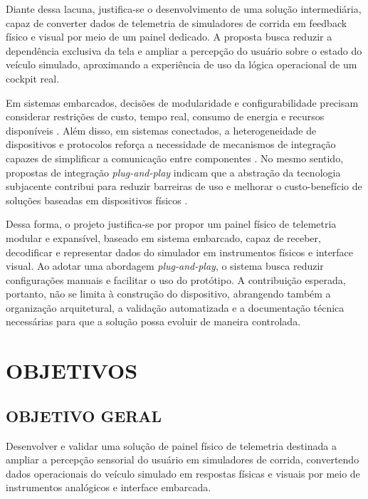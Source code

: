 \documentclass[
  12pt,
  oneside,
  a4paper,
  chapter=TITLE,
  section=TITLE,
  subsection=TITLE,
  brazil
]{abntex2}
\begin{document}
Diante dessa lacuna, justifica-se o desenvolvimento de uma solução intermediária, capaz de converter dados de telemetria de simuladores de corrida em feedback físico e visual por meio de um painel dedicado. A proposta busca reduzir a dependência exclusiva da tela e ampliar a percepção do usuário sobre o estado do veículo simulado, aproximando a experiência de uso da lógica operacional de um cockpit real.

Em sistemas embarcados, decisões de modularidade e configurabilidade precisam considerar restrições de custo, tempo real, consumo de energia e recursos disponíveis \cite{friedrich2001}. Além disso, em sistemas conectados, a heterogeneidade de dispositivos e protocolos reforça a necessidade de mecanismos de integração capazes de simplificar a comunicação entre componentes \cite{alfuqaha2015}. No mesmo sentido, propostas de integração \textit{plug-and-play} indicam que a abstração da tecnologia subjacente contribui para reduzir barreiras de uso e melhorar o custo-benefício de soluções baseadas em dispositivos físicos \cite{roy2019}.

Dessa forma, o projeto justifica-se por propor um painel físico de telemetria modular e expansível, baseado em sistema embarcado, capaz de receber, decodificar e representar dados do simulador em instrumentos físicos e interface visual. Ao adotar uma abordagem \textit{plug-and-play}, o sistema busca reduzir configurações manuais e facilitar o uso do protótipo. A contribuição esperada, portanto, não se limita à construção do dispositivo, abrangendo também a organização arquitetural, a validação automatizada e a documentação técnica necessárias para que a solução possa evoluir de maneira controlada.

\section{OBJETIVOS}

\subsection{OBJETIVO GERAL}
Desenvolver e validar uma solução de painel físico de telemetria destinada a ampliar a percepção sensorial do usuário em simuladores de corrida, convertendo dados operacionais do veículo simulado em respostas físicas e visuais por meio de instrumentos analógicos e interface embarcada.
\end{document}
